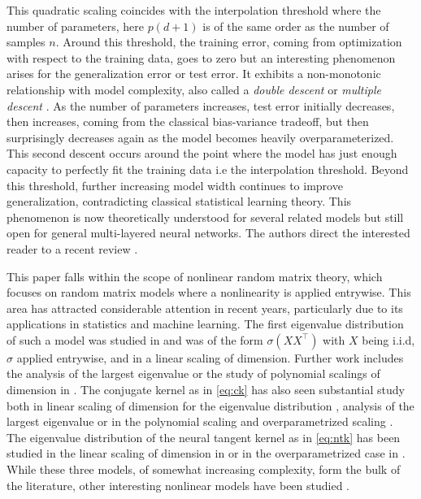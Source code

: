 \documentclass[letterpaper, 10pt, dvipsnames]{article}
\numberwithin{equation}{section}
\theoremstyle{definition}
\begin{document}
This quadratic scaling coincides with the interpolation threshold where the number of parameters, here $p(d+1)$ is of the same order as the number of samples $n$. Around this threshold, the training error, coming from optimization with respect to the training data, goes to zero but an interesting phenomenon arises for the generalization error or test error. It exhibits a non-monotonic relationship with model complexity, also called a \emph{double descent} \cites{neyshabur2015, zhang2021, belkin2019} or \emph{multiple descent} \cites{liang2020multiple,canatar2021spectral}. As the number of parameters increases, test error initially decreases, then increases, coming from the classical bias-variance tradeoff, but then surprisingly decreases again as the model becomes heavily overparameterized. This second descent occurs around the point where the model has just enough capacity to perfectly fit the training data i.e the interpolation threshold. Beyond this threshold, further increasing model width continues to improve generalization, contradicting classical statistical learning theory. This phenomenon is now theoretically understood for several related models \cites{belkin2020two, hastie2022surprises,mei2022generalization,montanari2022interpolation,schroder2023deterministic, latourelle2023dyson,montanari2025} but still open for general multi-layered neural networks. The authors direct the interested reader to a recent review \cite{misiakiewicz2024six}.

This paper falls within the scope of nonlinear random matrix theory, which focuses on random matrix models where a nonlinearity is applied entrywise. This area has attracted considerable attention in recent years, particularly due to its applications in statistics and machine learning. The first eigenvalue distribution of such a model was studied in \cites{elkaroui, chengsinger, do2013spectrum} and was of the form $\sigma(XX^\top)$ with $X$ being i.i.d, $\sigma$ applied entrywise, and in a linear scaling of dimension. Further work includes the analysis of the largest eigenvalue \cites{fan2019spectral} or the study of polynomial scalings of dimension in \cites{misiakiewicz2022spectrum,lu2022equivalence,dubova2023universality, pandit2024universality, kogan2024extremal}. The conjugate kernel as in \eqref{eq:ck} has also seen substantial study both in linear scaling of dimension for the eigenvalue distribution \cites{louart2018random, pennington2017nonlinear,benigni2021eigenvalue,fan2020spectra, piccolo2021analysis,chouard2023deterministic,latourelle2023dyson,guionnet2025global}, analysis of the largest eigenvalue \cites{benigni2022largest,wang2024nonlinear} or in the polynomial scaling \cite{hu2024asymptotics} and overparametrized scaling \cite{wang2024deformed}. The eigenvalue distribution of the neural tangent kernel as in \eqref{eq:ntk} has been studied in the linear scaling of dimension in \cite{fan2020spectra} or in the overparametrized case in \cite{wang2024deformed}. While these three models, of somewhat increasing complexity, form the bulk of the literature, other interesting nonlinear models have been studied \cites{liao2021,guionnet2023spectral, feldman2025spectral}. 
\end{document}
